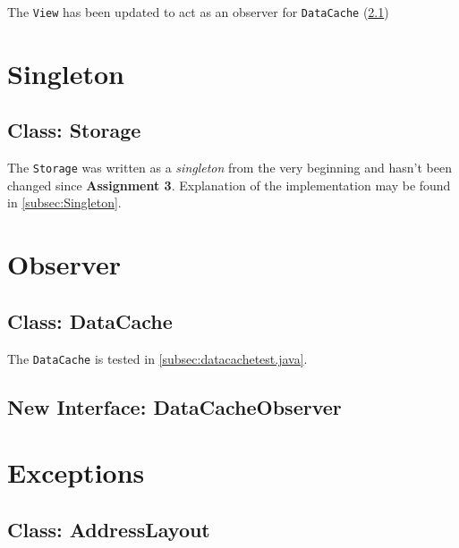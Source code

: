 \documentclass[a4paper]{scrreprt}
\begin{document}
The \texttt{View} has been updated to act as an observer for \texttt{DataCache} (\ref{subsec:datacache.java})



\section{Singleton}

\subsection{Class: Storage}
\label{subsec:storage.java}

The \texttt{Storage} was written as a \textit{singleton} from the very beginning and hasn't been changed since \textbf{Assignment 3}. Explanation of the implementation may be found in \ref{subsec:Singleton}.



\section{Observer}

\subsection{Class: DataCache}
\label{subsec:datacache.java}

The \texttt{DataCache} is tested in \ref{subsec:datacachetest.java}.



\subsection{New Interface: DataCacheObserver}
\label{subsec:datacacheobserver.java}



\section{Exceptions}

\subsection{Class: AddressLayout}
\label{subsec:addresslayout.java}
\end{document}
